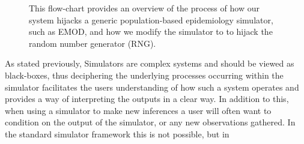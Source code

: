 \documentclass{article}
\begin{document}
\begin{figure}
{
  }
  \label{fig:how}
  \caption{This flow-chart provides an overview of the process of how our system hijacks a generic population-based epidemiology simulator, such as EMOD, and how we modify the simulator to 
  to hijack the random number generator (RNG).}
  \end{figure}
As stated previously, Simulators are complex systems and should be viewed as black-boxes, thus deciphering the underlying processes occurring within the simulator facilitates the users understanding of how such a system operates and provides a way of interpreting the outputs in a clear way. In addition to this, when using a simulator to make new inferences a user will often want to condition on the output of the simulator, or any new observations gathered. In the standard simulator framework this is not possible, but in 
\end{document}
